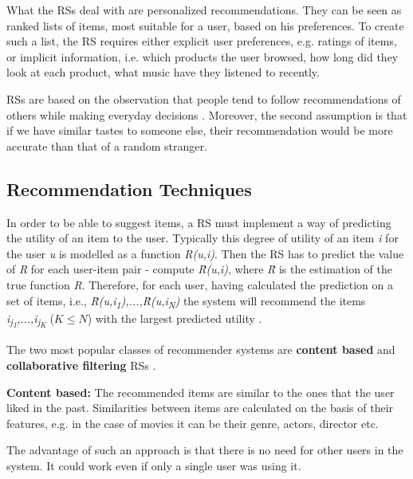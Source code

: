 \documentclass[12pt]{report}
\begin{document}
What the RSs deal with are personalized recommendations. They can be seen as ranked lists of items, most suitable for a user, based on his preferences. To create such a list, the RS requires either explicit user preferences, e.g. ratings of items, or implicit information, i.e. which products the user browsed, how long did they look at each product, what music have they listened to recently.

RSs are based on the observation that people tend to follow recommendations of others while making everyday decisions \cite{rec_sys_handbook}. Moreover, the second assumption is that if we have similar tastes to someone else, their recommendation would be more accurate than that of a random stranger.


\subsection{Recommendation Techniques}

In order to be able to suggest items, a RS must implement a way of predicting the utility of an item to the user. Typically this degree of utility of an item \textit{i} for the user \textit{u} is modelled as a function \textit{R(u,i)}. Then the RS has to predict the value of \textit{R} for each user-item pair - compute \textit{\^{R}(u,i)}, where \textit{\^{R}} is the estimation of the true function \textit{R}. Therefore, for each user, having calculated the prediction on a set of items, i.e., \textit{\^{R}(u,i\textsubscript{1}),...,\^{R}(u,i\textsubscript{N})} the system will recommend the items \textit{i\textsubscript{j\textsubscript{1}},...,i\textsubscript{j\textsubscript{K}}} ($K \leq N$) with the largest predicted utility \cite{rec_sys_handbook}.

The two most popular classes of recommender systems are {\bf content based} and {\bf collaborative filtering} RSs \cite{rec_sys_handbook}.

\hbox{}
{\bf Content based:} The recommended items are similar to the ones that the user liked in the past. Similarities between items are calculated on the basis of their features, e.g. in the case of movies it can be their genre, actors, director etc.

The advantage of such an approach is that there is no need for other users in the system. It could work even if only a single user was using it.
\end{document}
